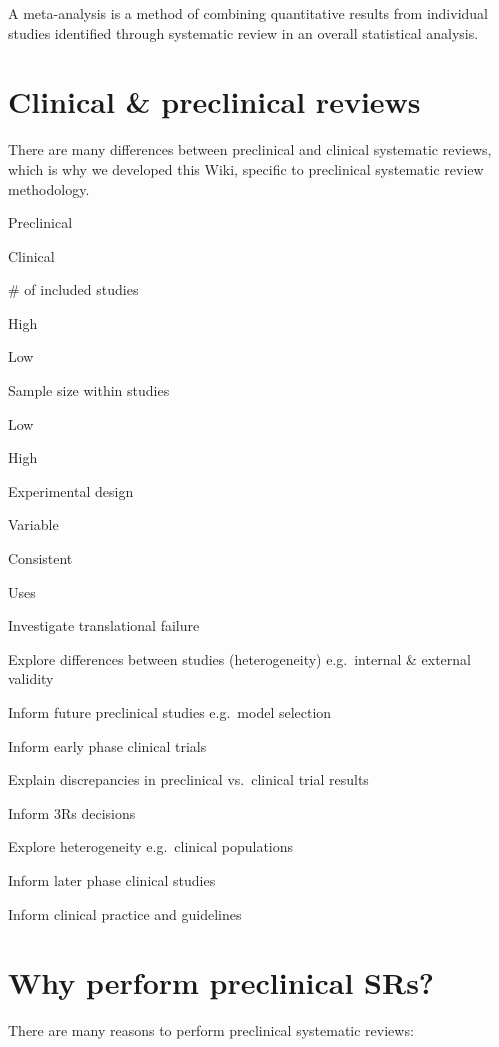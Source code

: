 \documentclass[
]{book}
\begin{document}
A meta-analysis is a method of combining quantitative results from individual studies identified through systematic review in an overall statistical analysis.

\section{Clinical \& preclinical reviews}\label{clinical-preclinical-reviews}

There are many differences between preclinical and clinical systematic reviews, which is why we developed this Wiki, specific to preclinical systematic review methodology.

Preclinical

Clinical

\# of included studies

High

Low

Sample size within studies

Low

High

Experimental design

Variable

Consistent

Uses

Investigate translational failure

Explore differences between studies (heterogeneity) e.g.~internal \& external validity

Inform future preclinical studies e.g.~model selection

Inform early phase clinical trials

Explain discrepancies in preclinical vs.~clinical trial results

Inform 3Rs decisions

Explore heterogeneity e.g.~clinical populations

Inform later phase clinical studies

Inform clinical practice and guidelines

\section{Why perform preclinical SRs?}\label{why-perform-preclinical-srs}

There are many reasons to perform preclinical systematic reviews:
\end{document}
